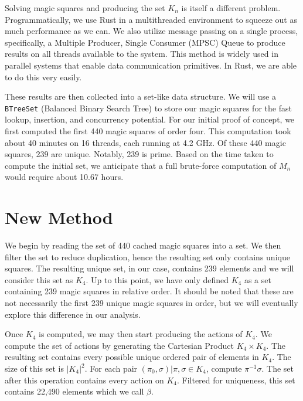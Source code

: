 \documentclass[12pt]{report}
\begin{document}
\par Solving magic squares and producing the set $K_n$ is itself a different problem.
Programmatically, we use Rust in a multithreaded environment to squeeze out as much performance as
we can. We also utilize message passing on a single process, specifically, a Multiple Producer,
Single Consumer (MPSC) Queue to produce results on all threads available to the system. This method
is widely used in parallel systems that enable data communication primitives. In Rust, we are able
to do this very easily.

\par These results are then collected into a set-like data structure. We will use a
\texttt{BTreeSet} (Balanced Binary Search Tree) to store our magic squares for the fast lookup,
insertion, and concurrency potential. For our initial proof of concept, we first computed the first
440 magic squares of order four. This computation took about 40 minutes on 16 threads, each running
at 4.2 GHz. Of these 440 magic squares, 239 are unique. Notably, 239 is prime. Based on the time
taken to compute the initial set, we anticipate that a full brute-force computation of $M_n$ would
require about 10.67 hours.

\section{New Method}
\par We begin by reading the set of 440 cached magic squares into a set. We then filter the set to
reduce duplication, hence the resulting set only contains unique squares. The resulting unique set,
in our case, contains 239 elements and we will consider this set as $K_4$. Up to this point, we
have only defined $K_4$ as a set containing 239 magic squares in relative order. It should be noted
that these are not necessarily the first 239 unique magic squares in order, but we will eventually
explore this difference in our analysis.

\par Once $K_4$ is computed, we may then start producing the actions of $K_4$. We compute the set
of actions by generating the Cartesian Product $K_4 \times K_4$. The resulting set contains every
possible unique ordered pair of elements in $K_4$. The size of this set is $\left|K_4\right|^2$.
For each pair $\left(\pi_0,\sigma\right)\vert \pi,\sigma\in K_4$, compute $\pi^{-1}\sigma$. The set
after
this operation contains every action on $K_4$. Filtered for uniqueness, this set contains 22,490
elements which we call $\beta$.
\end{document}
